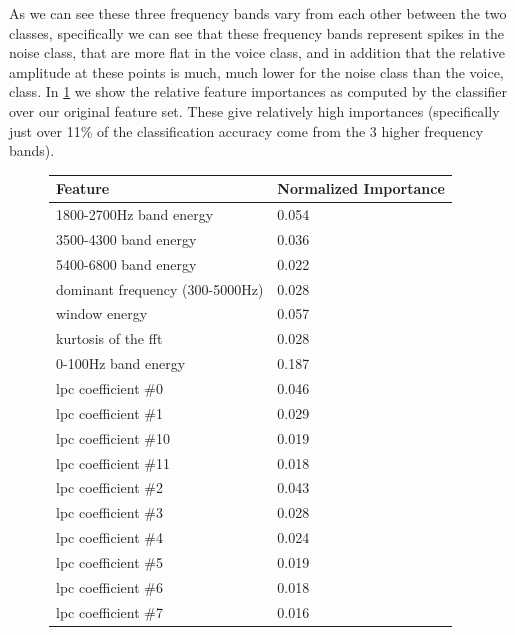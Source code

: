 \documentclass[ %
                    author={Sam Phippen},
                supervisor={Dr. Rafal Bogacz},
                     title={Real time voice activity detectors in noisy personal computing environments},
                  subtitle={},
                    degree={MEng},
                      year={2012} ]{thesis}
\begin{document}
As we can see these three frequency bands vary from each other between the two
classes, specifically we can see that these frequency bands represent spikes in
the noise class, that are more flat in the voice class, and in addition that
the relative amplitude at these points is much, much lower for the noise class
than the voice, class. In \ref{table:importances} we show the relative feature
importances as computed by the classifier over our original feature set. These
give relatively high importances (specifically just over 11\% of
the classification accuracy come from the 3 higher frequency bands).

\begin{figure}
    \label{table:importances}
    \begin{tabular}{| l | l |}
    \hline
        Feature                                    & Normalized Importance \\ \hline
        1800-2700Hz band energy                    & 0.054 \\
        3500-4300 band energy                      & 0.036 \\
        5400-6800 band energy                      & 0.022 \\
        dominant frequency (300-5000Hz)            & 0.028 \\
        window energy                              & 0.057 \\
        kurtosis of the fft                        & 0.028 \\
        0-100Hz band energy                        & 0.187 \\
        lpc coefficient \#0                        & 0.046 \\
        lpc coefficient \#1                        & 0.029 \\
        lpc coefficient \#10                       & 0.019 \\
        lpc coefficient \#11                       & 0.018 \\
        lpc coefficient \#2                        & 0.043 \\
        lpc coefficient \#3                        & 0.028 \\
        lpc coefficient \#4                        & 0.024 \\
        lpc coefficient \#5                        & 0.019 \\
        lpc coefficient \#6                        & 0.018 \\
        lpc coefficient \#7                        & 0.016 \\

\end{tabular}
\end{figure}
\end{document}
